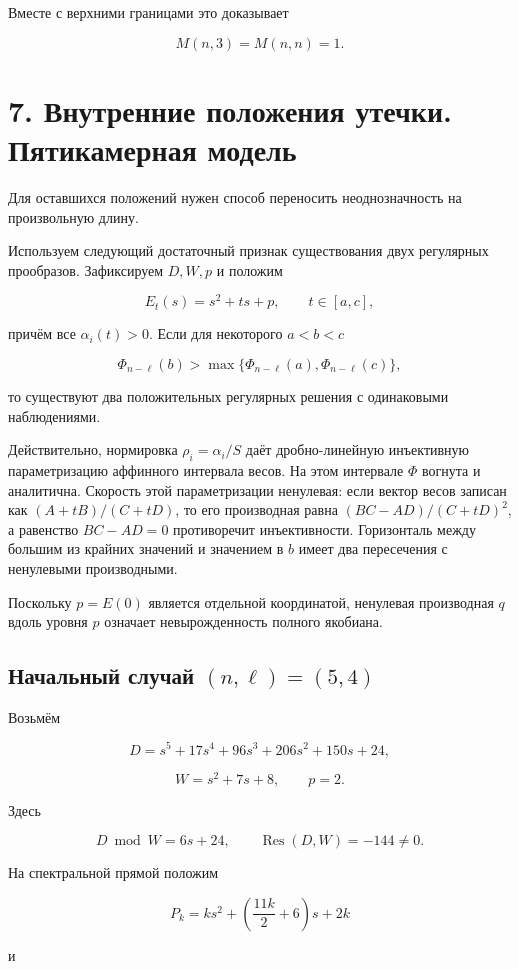 \documentclass[11pt,a4paper]{article}
\begin{document}
Вместе с верхними границами это доказывает

\[
M(n,3)=M(n,n)=1.
\]

\section*{\color{ink} 7. Внутренние положения утечки. Пятикамерная модель}

Для оставшихся положений нужен способ переносить неоднозначность на произвольную длину.

Используем следующий достаточный признак существования двух регулярных прообразов. Зафиксируем \(D,W,p\) и положим

\[
E_t(s)=s^2+ts+p,\qquad t\in[a,c],
\]

причём все \(\alpha_i(t)>0\). Если для некоторого \(a<b<c\)

\[
\boxed{
\Phi_{n-\ell}(b)>
\max\{\Phi_{n-\ell}(a),\Phi_{n-\ell}(c)\},
}
\tag{6}
\]

то существуют два положительных регулярных решения с одинаковыми наблюдениями.

Действительно, нормировка \(\rho_i=\alpha_i/S\) даёт дробно-линейную инъективную параметризацию аффинного интервала весов. На этом интервале \(\Phi\) вогнута и аналитична. Скорость этой параметризации ненулевая: если вектор весов записан как \((A+tB)/(C+tD)\), то его производная равна \((BC-AD)/(C+tD)^2\), а равенство \(BC-AD=0\) противоречит инъективности. Горизонталь между большим из крайних значений и значением в \(b\) имеет два пересечения с ненулевыми производными.

Поскольку \(p=E(0)\) является отдельной координатой, ненулевая производная \(q\) вдоль уровня \(p\) означает невырожденность полного якобиана.

\subsection*{Начальный случай \((n,\ell)=(5,4)\)}

Возьмём

\[
D=s^5+17s^4+96s^3+206s^2+150s+24,
\]

\[
W=s^2+7s+8,\qquad p=2.
\]

Здесь

\[
D\bmod W=6s+24,\qquad
\operatorname{Res}(D,W)=-144\ne0.
\]

На спектральной прямой положим

\[
P_k=ks^2+\left(\frac{11k}{2}+6\right)s+2k
\]

и
\end{document}

